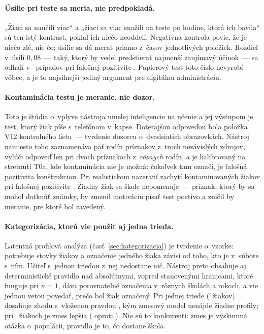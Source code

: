 \paragraph{Úsilie pri teste sa meria, nie predpokladá.} „Žiaci sa naučili viac“ a „žiaci sa viac snažili na teste po hodine, ktorá ich bavila“ sú ten istý kontrast, pokiaľ ich niečo neoddelí. Negatívna kontrola povie, že je niečo zlé, nie čo; úsilie sa dá merať priamo z~časov jednotlivých položiek. Rozdiel v~úsilí $0{,}08$~--- taký, ktorý by vedel predstierať najmenší zaujímavý účinok~--- sa odhalí v~\asmEffortDetect{} prípadov pri falošnej pozitivite \asmEffortFalsePos{}. Papierový test toto číslo nevyrobí vôbec, a je to najsilnejší jediný argument pre digitálnu administráciu.

\paragraph{Kontaminácia testu je meranie, nie dozor.} Toto je štúdia o~vplyve nástroja umelej inteligencie na učenie a jej výstupom je test, ktorý žiak píše s~telefónom v~kapse. Doterajšou odpoveďou bola položka V12 kontrolného listu~--- tvrdenie dozorcu o~dvadsiatich obrazovkách. Nástroj namiesto toho zaznamenáva päť rodín príznakov z~troch nezávislých zdrojov, vylúči odpoveď len pri dvoch príznakoch z~\emph{rôznych} rodín, a je kalibrovaný na stretnutí T0a, kde kontaminácia nie je možná: čokoľvek tam označí, je falošná pozitivita konštrukciou. Pri realistickom nazeraní zachytí \asmIntegDetect{} kontaminovaných žiakov pri falošnej pozitivite \asmIntegFalsePos{}. Žiadny žiak sa škole nepomenuje~--- príznak, ktorý by sa mohol dotknúť známky, by zmenil motiváciu písať test poctivo a zničil by meranie, pre ktoré bol zavedený.

\paragraph{Kategorizácia, ktorú vie použiť aj jedna trieda.} Latentná profilová analýza (časť~\ref{sec:kategorizacia}) je tvrdenie o~vzorke: potrebuje stovky žiakov a označenie jedného žiaka závisí od toho, kto je v~súbore s~ním. Učiteľ s~jednou triedou z~nej nedostane nič. Nástroj preto obsahuje aj deterministické pravidlo nad absolútnymi, vopred stanovenými hranicami, ktoré funguje pri $n=1$, dáva porovnateľné označenia v~rôznych školách a rokoch, a vie jednou vetou povedať, prečo bol žiak označený. Pri jednej triede (\asmNClass{}~žiakov) dosahuje zhodu s~vloženou pravdou \asmRuleAriClass{}, kým zmesový model nenájde žiadne profily; pri \asmNStudy{}~žiakoch je zmes lepšia (\asmLpaAriStudy{} oproti \asmRuleAriStudy{}). Nie sú to konkurenti: zmes je výskumná otázka o~populácii, pravidlo je to, čo dostane škola.

